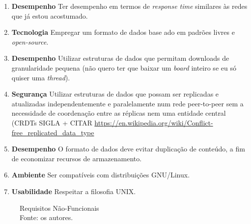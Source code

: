 \begin{enumerate}
    \item \textbf{Desempenho} Ter desempenho em termos de \textit{response time} similares às redes que já estou acostumado.
    \item \textbf{Tecnologia} Empregar um formato de dados base ado em padrões livres e \textit{open-source}.
    \item \textbf{Desempenho} Utilizar estruturas de dados que permitam downloads de granularidade pequena (não quero ter que baixar um \textit{board} inteiro se eu só quiser uma \textit{thread}).
    \item \textbf{Segurança} Utilizar estruturas de dados que possam ser replicadas e atualizadas independentemente e paralelamente num rede peer-to-peer sem a necessidade de coordenação entre as réplicas nem uma entidade central (CRDTs SIGLA + CITAR \url{https://en.wikipedia.org/wiki/Conflict-free_replicated_data_type}
    \item \textbf{Desempenho} O formato de dados deve evitar duplicação de conteúdo, a fim de economizar recursos de armazenamento.
    \item \textbf{Ambiente} Ser compatíveis com distribuições GNU/Linux.
    \item \textbf{Usabilidade} Respeitar a filosofia UNIX.
\end{enumerate}
\begin{figure}[H]
    \centering
    
    \caption[Requisitos Não-Funcionais]{\label{fig:Requisitos_Nao_Funcionais}
        Requisitos Não-Funcionais\\
        Fonte: os autores.
    }
\end{figure}


